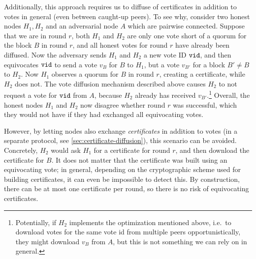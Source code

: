 Additionally, this approach requires us to diffuse of certificates in addition to votes in general (even between caught-up peers).
To see why, consider two honest nodes $H_1,H_2$ and an adversarial node $A$ which are pairwise connected.
Suppose that we are in round $r$, both $H_1$ and $H_2$ are only one vote short of a quorum for the block $B$ in round $r$, and all honest votes for round $r$ have already been diffused.
Now the adversary sends $H_1$ and $H_2$ a new vote ID $\mathtt{vid}$, and then equivocates $\mathtt{vid}$ to send a vote $v_B$ for $B$ to $H_1$, but a vote $v_{B'}$ for a block $B' \neq B$ to $H_2$.
Now $H_1$ observes a quorum for $B$ in round $r$, creating a certificate, while $H_2$ does not.
The vote diffusion mechanism described above causes $H_2$ to not request a vote for $\mathtt{vid}$ from $A$, because $H_2$ already has received $v_{B'}$.\footnote{Potentially, if $H_2$ implements the optimization mentioned above, i.e.\ to download votes for the same vote id from multiple peers opportunistically, they might download $v_B$ from $A$, but this is not something we can rely on in general.}
Overall, the honest nodes $H_1$ and $H_2$ now disagree whether round $r$ was successful, which they would not have if they had exchanged all equivocating votes.

However, by letting nodes also exchange \emph{certificates} in addition to votes (in a separate protocol, see \cref{sec:certificate-diffusion}), this scenario can be avoided.
Concretely, $H_2$ would ask $H_1$ for a certificate for round $r$, and then download the certificate for $B$.
It does not matter that the certificate was built using an equivocating vote; in general, depending on the cryptographic scheme used for building certificates, it can even be impossible to detect this.
By construction, there can be at most one certificate per round, so there is no risk of equivocating certificates.



